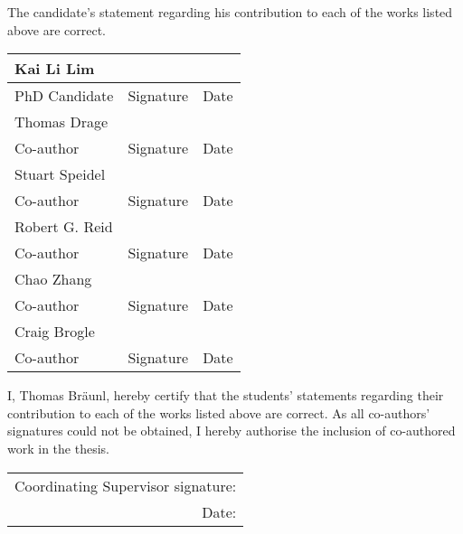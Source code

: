 \pagebreak

\noindent The candidate's statement regarding his contribution to each of the works listed above are correct.
\vspace{8ex}

\begin{table}[ht]
	\centering
	\renewcommand{\arraystretch}{.1} %
	\floatsep -10cm
	\begin{tabular}{p{}p{}p{}}
		Kai Li Lim & \centering  & \multicolumn{1}{r}{} \\ \midrule
		PhD Candidate     & \multicolumn{1}{c}{Signature} & \multicolumn{1}{r}{Date} \\[8ex]
		Thomas Drage & \centering  & \multicolumn{1}{r}{} \\ \midrule
		Co-author     & \multicolumn{1}{c}{Signature} & \multicolumn{1}{r}{Date} \\[8ex]
		Stuart Speidel & \centering  & \multicolumn{1}{r}{} \\ \midrule
		Co-author     & \multicolumn{1}{c}{Signature} & \multicolumn{1}{r}{Date} \\[8ex]
		Robert G. Reid & \centering  & \multicolumn{1}{r}{} \\ \midrule
		Co-author     & \multicolumn{1}{c}{Signature} & \multicolumn{1}{r}{Date} \\[8ex]  
		Chao Zhang &\centering  & \multicolumn{1}{r}{} \\ \midrule
		Co-author     & \multicolumn{1}{c}{Signature} & \multicolumn{1}{r}{Date} \\[8ex]
		Craig Brogle &\centering  & \multicolumn{1}{r}{} \\ \midrule
		Co-author     & \multicolumn{1}{c}{Signature} & \multicolumn{1}{r}{Date} \\%
	\end{tabular}
\end{table}

\begin{samepage}
	\noindent I, Thomas Bräunl, hereby certify that the students' statements regarding their contribution to each of the works listed above are correct. As all co-authors' signatures could not be obtained, I hereby authorise the inclusion of co-authored work in the thesis.
	
	\vspace{6ex}
	
	\begin{table}[h]
		\flushleft
		\begin{tabular}{r}
			Coordinating Supervisor signature: \\
			Date:\\
		\end{tabular}
	\end{table}
\end{samepage}